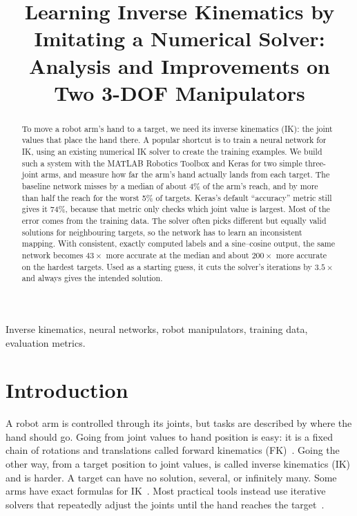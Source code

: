\documentclass[conference]{IEEEtran}
\title{Learning Inverse Kinematics by Imitating a Numerical Solver: Analysis and Improvements on Two 3-DOF Manipulators}
\author{\IEEEauthorblockN{Durgesh S. Reddiyar}
\IEEEauthorblockA{Ira A. Fulton Schools of Engineering\\
Arizona State University, Tempe, AZ, USA\\
dreddiya@asu.edu}}
\begin{document}
\maketitle

\begin{abstract}
To move a robot arm's hand to a target, we need its inverse kinematics (IK): the joint values that place the hand there. A popular shortcut is to train a neural network for IK, using an existing numerical IK solver to create the training examples. We build such a system with the MATLAB Robotics Toolbox and Keras for two simple three-joint arms, and measure how far the arm's hand actually lands from each target. The baseline network misses by a median of about 4\% of the arm's reach, and by more than half the reach for the worst 5\% of targets. Keras's default ``accuracy'' metric still gives it 74\%, because that metric only checks which joint value is largest. Most of the error comes from the training data. The solver often picks different but equally valid solutions for neighbouring targets, so the network has to learn an inconsistent mapping. With consistent, exactly computed labels and a sine--cosine output, the same network becomes $43\times$ more accurate at the median and about $200\times$ more accurate on the hardest targets. Used as a starting guess, it cuts the solver's iterations by $3.5\times$ and always gives the intended solution.
\end{abstract}

\begin{IEEEkeywords}
Inverse kinematics, neural networks, robot manipulators, training data, evaluation metrics.
\end{IEEEkeywords}

\section{Introduction}

A robot arm is controlled through its joints, but tasks are described by where the hand should go. Going from joint values to hand position is easy: it is a fixed chain of rotations and translations called forward kinematics (FK)~\cite{siciliano2009robotics}. Going the other way, from a target position to joint values, is called inverse kinematics (IK) and is harder. A target can have no solution, several, or infinitely many. Some arms have exact formulas for IK~\cite{pieper1968kinematics,diankov2010automated}. Most practical tools instead use iterative solvers that repeatedly adjust the joints until the hand reaches the target~\cite{wampler1986manipulator,nakamura1986inverse,buss2004introduction,sugihara2011solvability,beeson2015trac}.
\end{document}
